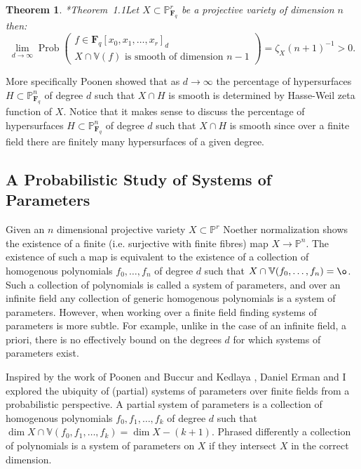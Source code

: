 \documentclass[10pt,reqno]{amsart}
\newtheorem{theorem}[lemma]{Theorem}
\theoremstyle{remark}
\newcommand{\Prob}{\operatorname{Prob}}
\newcommand{\fF}{\mathbf F}
\renewcommand{\P}{\mathbb{P}}
\newcommand{\V}{\mathbb{V}}
\begin{document}
\begin{theorem}\cite{poonen04}*{Theorem~1.1}\label{thm:poonen}
Let $X\subset \P^{r}_{\fF_{q}}$ be a projective variety of dimension $n$ then:
\begin{equation}\label{eq:poonen}
\lim_{d\to \infty} \Prob\left(\begin{matrix} f\in \fF_{q}[x_{0},x_{1},\ldots,x_{r}]_{d}\\ \text{$X\cap \V(f)$ is smooth of dimension $n-1$}\end{matrix}\right)=
\zeta_X(n+1)^{-1} >0.
\end{equation}
\end{theorem}

More specifically Poonen showed that as $d\to\infty$ the percentage of hypersurfaces $H\subset \P_{\fF_{q}}^{n}$ of degree $d$ such that $X\cap H$ is smooth is determined by Hasse-Weil zeta function of $X$. Notice that it makes sense to discuss the percentage of hypersurfaces $H\subset \P_{\fF_{q}}^{n}$ of degree $d$ such that $X\cap H$ is smooth since over a finite field there are finitely many hypersurfaces of a given degree.


\subsection{A Probabilistic Study of Systems of Parameters} 

Given an $n$ dimensional projective variety $X\subset \P^r$ Noether normalization shows the existence of a finite (i.e. surjective with finite fibres) map $X\rightarrow \P^n$. The existence of such a map is equivalent to the existence of a collection of homogenous polynomials $f_{0},\ldots,f_{n}$ of degree $d$ such that $X\cap \V(f_{0},\ldots,f_{n})=\o$. Such a collection of polynomials is called a system of parameters, and over an infinite field any collection of generic homogenous polynomials is a system of parameters. However, when working over a finite field finding systems of parameters is more subtle. For example, unlike in the case of an infinite field, a priori, there is no effectively bound on the degrees $d$ for which systems of parameters exist. 

Inspired by the work of Poonen \cite{poonen04} and Buccur and Kedlaya \cite{bucurKedlaya12}, Daniel Erman and I explored the ubiquity of (partial) systems of parameters over finite fields from a probabilistic perspective. A partial system of parameters is a collection of homogenous polynomials $f_{0},f_{1},\ldots,f_{k}$ of degree $d$ such that $\dim X\cap \V(f_{0},f_{1},\ldots,f_{k}) = \dim X - (k+1)$. Phrased differently a collection of polynomials is a system of parameters on $X$ if they intersect $X$ in the correct dimension. 
\end{document}
